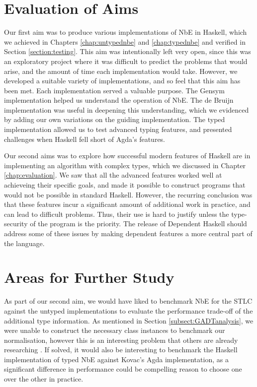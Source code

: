 \section{Evaluation of Aims}


Our first aim was to produce various implementations of NbE in Haskell, which we achieved in Chapters \ref{chap:untypednbe} and \ref{chap:typednbe} and verified in Section \ref{section:testing}. This aim was intentionally left very open, since this was an exploratory project where it was difficult to predict the problems that would arise, and the amount of time each implementation would take. However, we developed a suitable variety of implementations, and so feel that this aim has been met. Each implementation served a valuable purpose. The Gensym implementation helped us understand the operation of NbE. The de Bruijn implementation was useful in deepening this understanding, which we evidenced by adding our own variations on the guiding implementation. The typed implementation allowed us to test advanced typing features, and presented challenges when Haskell fell short of Agda's features. 

Our second aims was to explore how successful modern features of Haskell are in implementing an algorithm with complex types, which we discussed in Chapter \ref{chap:evaluation}. We saw that all the advanced features worked well at achieveing their specific goals, and made it possible to construct programs that would not be possible in standard Haskell. However, the recurring conclusion was that these features incur a significant amount of additional work in practice, and can lead to difficult problems. Thus, their use is hard to justify unless the type-security of the program is the priority. The release of Dependent Haskell \cite{DH} should address some of these issues by making dependent features a more central part of the language.

\section{Areas for Further Study}

As part of our second aim, we would have liked to benchmark NbE for the STLC against the untyped implementations to evaluate the performance trade-off of the additional type information. As mentioned in Section \ref{subsect:GADTanalysis}, we were unable to construct the necessary class instances to benchmark our normalisation, however this is an interesting problem that others are already researching \cite{gadtClassInstances}. If solved, it would also be interesting to benchmark the Haskell implementation of typed NbE against Kovac's Agda implementation, as a significant difference in performance could be compelling reason to choose one over the other in practice.

